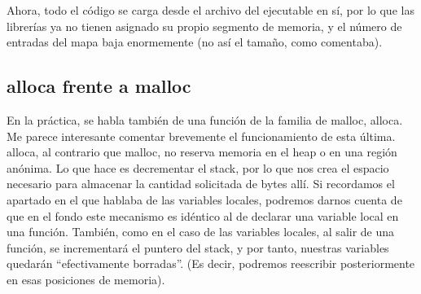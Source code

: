 \documentclass[a4paper]{article}
\begin{document}
Ahora, todo el código se carga desde el archivo del ejecutable en sí, por lo que las librerías ya no tienen asignado su propio segmento de memoria, y el número de entradas del mapa baja enormemente (no así el tamaño, como comentaba).

\subsection{{\ttfamily alloca} frente a {\ttfamily malloc}}

En la práctica, se habla también de una función de la familia de {\ttfamily malloc}, {\ttfamily alloca}. Me parece interesante comentar brevemente el funcionamiento de esta última. {\ttfamily alloca}, al contrario que {\ttfamily malloc}, no reserva memoria en el heap o en una región anónima. Lo que hace es decrementar el stack, por lo que nos crea el espacio necesario para almacenar la cantidad solicitada de bytes allí. Si recordamos el apartado en el que hablaba de las variables locales, podremos darnos cuenta de que en el fondo este mecanismo es idéntico al de declarar una variable local en una función. También, como en el caso de las variables locales, al salir de una función, se incrementará el puntero del stack, y por tanto, nuestras variables quedarán ``efectivamente borradas''. (Es decir, podremos reescribir posteriormente en esas posiciones de memoria).
\end{document}
